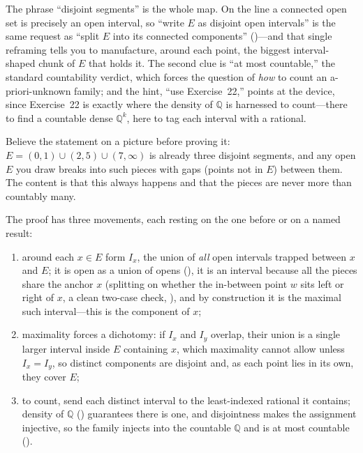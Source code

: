 \documentclass[main.tex]{subfiles}
\begin{document}
\begin{Reflection}
The phrase ``disjoint segments'' is the whole map. On the line a connected open set is precisely an open
interval, so ``write $E$ as disjoint open intervals'' is the same request as ``split $E$ into its
connected components'' ()---and that single reframing tells you to manufacture, around each
point, the biggest interval-shaped chunk of $E$ that holds it. The second clue is ``at most countable,''
the standard countability verdict, which forces the question of \emph{how} to count an a-priori-unknown
family; and the hint, ``use Exercise~22,'' points at the device, since Exercise~22 is exactly where the
density of $\mathbb Q$ is harnessed to count---there to find a countable dense $\mathbb Q^k$, here to tag
each interval with a rational.

Believe the statement on a picture before proving it: $E=(0,1)\cup(2,5)\cup(7,\infty)$ is already three
disjoint segments, and any open $E$ you draw breaks into such pieces with gaps (points not in $E$)
between them. The content is that this always happens and that the pieces are never more than countably
many.

The proof has three movements, each resting on the one before or on a named result:
\begin{enumerate}[leftmargin=1.7em,itemsep=3pt,topsep=2pt,label=\textnormal{(\arabic*)}]
  \item around each $x\in E$ form $I_x$, the union of \emph{all} open intervals trapped between $x$ and
        $E$; it is open as a union of opens (), it is
        an interval because all the pieces share the anchor $x$ (splitting on whether the in-between point
        $w$ sits left or right of $x$, a clean two-case check, ), and by construction it is
        the maximal such interval---this is the component of $x$;
  \item maximality forces a dichotomy: if $I_x$ and $I_y$ overlap, their union is a single larger
        interval inside $E$ containing $x$, which maximality cannot allow unless $I_x=I_y$, so distinct
        components are disjoint and, as each point lies in its own, they cover $E$;
  \item to count, send each distinct interval to the least-indexed rational it contains; density of
        $\mathbb Q$ () guarantees there is one, and
        disjointness makes the assignment injective, so the family injects into the countable $\mathbb Q$
        and is at most countable ().
\end{enumerate}


\end{Reflection}
\end{document}

